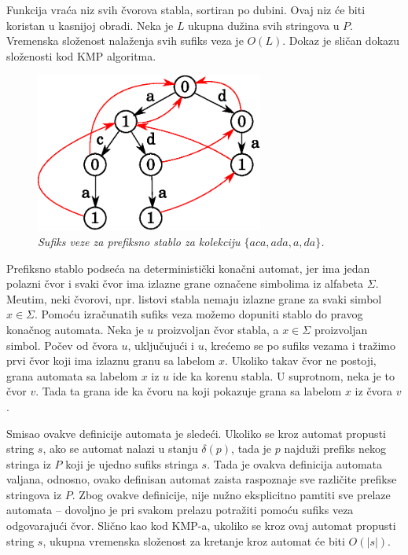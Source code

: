 Funkcija vra\' ca niz svih \v cvorova stabla, sortiran po dubini. Ovaj niz \' ce biti koristan u kasnijoj obradi. Neka je $L$ ukupna du\v zina svih stringova u $P$. Vremenska slo\v zenost nala\v zenja svih sufiks veza je $O(L)$\cite{ahorad}. Dokaz je sli\v can dokazu slo\v zenosti kod KMP algoritma.

\begin{figure}[H]
    \centering
    \includegraphics[width=75mm]{../img/aho1.eps}
    \caption*{\textit{Sufiks veze za prefiksno stablo za kolekciju $\{aca,ada,a,da\}$.}}
\end{figure}

Prefiksno stablo podse\' ca na deterministi\v cki kona\v cni automat, jer ima jedan polazni \v cvor i svaki \v cvor ima izlazne grane ozna\v cene simbolima iz alfabeta $\Sigma$. Me\dj utim, neki \v cvorovi, npr. listovi stabla nemaju izlazne grane za svaki simbol $x \in \Sigma$. Pomo\' cu izra\v cunatih sufiks veza mo\v zemo dopuniti stablo do pravog kona\v cnog automata. Neka je $u$ proizvoljan \v cvor stabla, a $x \in \Sigma$ proizvoljan simbol. Po\v cev od \v cvora $u$, uklju\v cuju\' ci i $u$, kre\' cemo se po sufiks vezama i tra\v zimo prvi \v cvor koji ima izlaznu granu sa labelom $x$. Ukoliko takav \v cvor ne postoji, grana automata sa labelom $x$ iz $u$ ide ka korenu stabla. U suprotnom, neka je to \v cvor $v$. Tada ta grana ide ka \v cvoru na koji pokazuje grana sa labelom $x$ iz \v cvora $v$.

Smisao ovakve definicije automata je slede\' ci. Ukoliko se kroz automat propusti string $s$, ako se automat nalazi u stanju $\delta(p)$, tada je $p$ najdu\v zi prefiks nekog stringa iz $P$ koji je ujedno sufiks stringa $s$. Tada je ovakva definicija automata valjana, odnosno, ovako definisan automat zaista raspoznaje sve razli\v cite prefikse stringova iz $P$. Zbog ovakve definicije, nije nu\v zno eksplicitno pamtiti sve prelaze automata -- dovoljno je pri svakom prelazu potra\v ziti pomo\' cu sufiks veza odgovaraju\' ci \v cvor. Sli\v cno kao kod KMP-a, ukoliko se kroz ovaj automat propusti string $s$, ukupna vremenska slo\v zenost za kretanje kroz automat \' ce biti $O(|s|)$. \cite{ahorad}

